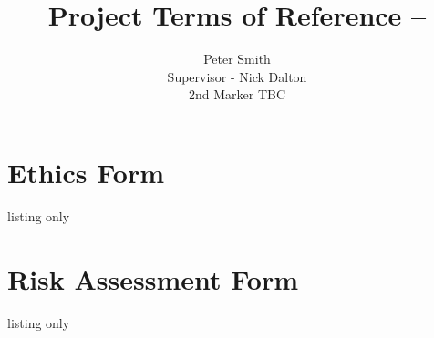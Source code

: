 \documentclass[12pt]{article}
\title{Project Terms of Reference -- }
\author{Peter Smith \\
\small Supervisor - Nick Dalton\\
\small 2nd Marker TBC
}
\begin{document}
\maketitle


\printbibliography
\appendix

\section{Ethics Form}
\begin{tcblisting}{listing only}

\end{tcblisting}


\section{Risk Assessment Form}
\begin{tcblisting}{listing only}
%
\end{tcblisting}
\end{document}
